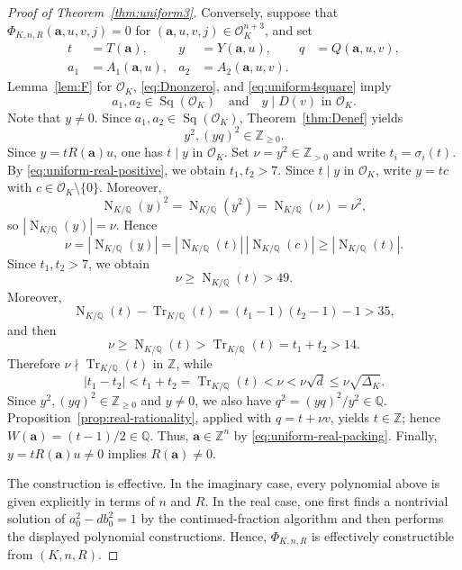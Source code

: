 \documentclass[12pt]{amsart}
\numberwithin{equation}{section}
\theoremstyle{remark}
\theoremstyle{plain}
\newcommand{\Z}{\mathbb{Z}}
\newcommand{\Q}{\mathbb{Q}}
\newcommand{\sO}{\mathcal{O}}
\newcommand{\ba}{\mathbf{a}}
\newcommand{\Sq}[1]{\operatorname{Sq}(#1)}
\newcommand{\Tr}{\operatorname{Tr}}
\newcommand{\Norm}{\operatorname{N}}
\begin{document}
\begin{proof}[Proof of Theorem~\ref{thm:uniform3}]
Conversely, suppose that
$\Phi_{K,n,R}(\ba,u,v,j)=0$ for $(\ba,u,v,j)\in\sO_K^{n+3}$, and set
\begin{align*}
t&=T(\ba),& y&=Y(\ba,u),& q&=Q(\ba,u,v),\\
a_1&=A_1(\ba,u),& a_2&=A_2(\ba,u,v).
\end{align*}
Lemma~\ref{lem:F} for $\sO_K$, \eqref{eq:Dnonzero}, and \eqref{eq:uniform4square} imply
\[
a_1,a_2\in\Sq{\sO_K}\quad\text{and}\quad y\mid D(v)\text{ in }\sO_K.
\]
Note that $y\neq0$. Since $a_1,a_2\in\Sq{\sO_K}$, Theorem~\ref{thm:Denef} yields
\[
y^2,(yq)^2\in\Z_{\geq0}.
\]
Since $y=tR(\ba)u$, one has $t\mid y$ in $\sO_K$. Set $\nu=y^2\in\Z_{>0}$ and write $t_i=\sigma_i(t)$. By \eqref{eq:uniform-real-positive}, we obtain $t_1,t_2>7$. Since $t\mid y$ in $\sO_K$, write $y=tc$ with $c\in\sO_K\setminus\{0\}$. Moreover,
\[
\Norm_{K/\Q}(y)^2=\Norm_{K/\Q}(y^2)=\Norm_{K/\Q}(\nu)=\nu^2,
\]
so $|\Norm_{K/\Q}(y)|=\nu$. Hence
\[
\nu=|\Norm_{K/\Q}(y)|=|\Norm_{K/\Q}(t)|\,|\Norm_{K/\Q}(c)|\geq |\Norm_{K/\Q}(t)|.
\]
Since $t_1,t_2>7$, we obtain
\[
\nu\geq\Norm_{K/\Q}(t)>49.
\]
Moreover,
\[
\Norm_{K/\Q}(t)-\Tr_{K/\Q}(t)=(t_1-1)(t_2-1)-1>35,
\]
and then
\[
\nu\geq\Norm_{K/\Q}(t)>\Tr_{K/\Q}(t)=t_1+t_2>14.
\]
Therefore $\nu\nmid\Tr_{K/\Q}(t)$ in $\Z$, while
\[
|t_1-t_2|<t_1+t_2=\Tr_{K/\Q}(t)<\nu<\nu\sqrt{d}\leq\nu\sqrt{\Delta_K}.
\]
Since $y^2,(yq)^2\in\Z_{\geq0}$ and $y\neq0$, we also have $q^2=(yq)^2/y^2\in\Q$. Proposition~\ref{prop:real-rationality}, applied with $q=t+\nu v$, yields $t\in\Z$; hence $W(\ba)=(t-1)/2\in\Q$. Thus, $\ba\in\Z^n$ by \eqref{eq:uniform-real-packing}. Finally, $y=tR(\ba)u\neq0$ implies $R(\ba)\neq0$.

\smallskip

The construction is effective. In the imaginary case, every polynomial above is given explicitly in terms of $n$ and $R$. In the real case, one first finds a nontrivial solution of $a_0^2-db_0^2=1$ by the continued-fraction algorithm and then performs the displayed polynomial constructions. Hence, $\Phi_{K,n,R}$ is effectively constructible from $(K,n,R)$.
\end{proof}
\end{document}
